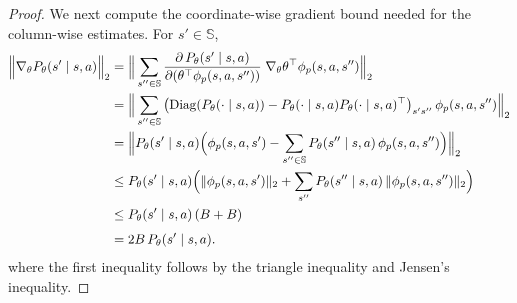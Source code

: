 \documentclass[10pt]{article} %
\theoremstyle{plain}
\theoremstyle{definition}
\theoremstyle{remark}
\newcommand{\bS}{\mathbb{S}}
\begin{document}
\begin{proof}
\medskip
\noindent
We next compute the coordinate-wise gradient bound needed for the column-wise estimates. For $s'\in\bS$,
\begin{align}
\Big\|\nabla_\theta P_\theta(s'\mid s,a)\Big\|_2
&=\Big\|\sum_{s''\in\bS}\frac{\partial\, P_\theta(s'\mid s,a)}{\partial(\theta^\top\phi_p(s,a,s''))}\;\nabla_\theta \theta^\top\phi_p(s,a,s'')\Big\|_2\notag\\
&=\Big\|\sum_{s''\in\bS}\big(\mathrm{Diag}(P_\theta(\cdot\mid s,a))-P_\theta(\cdot\mid s,a)P_\theta(\cdot\mid s,a)^\top\big)_{s's''}\,\phi_p(s,a,s'')\Big\|_2\notag\\
&=\Big\|P_\theta(s'\mid s,a)\Big(\phi_p(s,a,s')-\sum_{s''\in\bS} P_\theta(s''\mid s,a)\,\phi_p(s,a,s'')\Big)\Big\|_2\notag\\
&\le P_\theta(s'\mid s,a)\Big(\|\phi_p(s,a,s')\|_2+\sum_{s''}P_\theta(s''\mid s,a)\,\|\phi_p(s,a,s'')\|_2\Big)\notag\\
&\le P_\theta(s'\mid s,a)\,(B+B)\notag\\[4pt]
&=2B\,P_\theta(s'\mid s,a). \label{eq:transition-kernel-grad-bound}
\end{align}
where the first inequality follows by the triangle inequality and Jensen’s inequality.


\end{proof}
\end{document}
